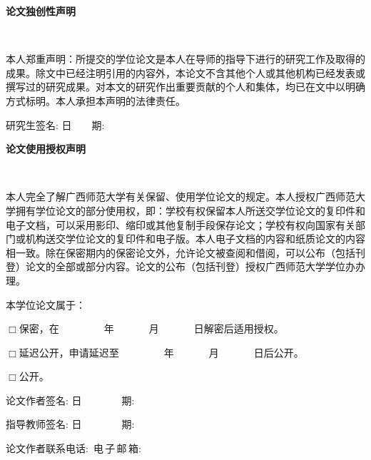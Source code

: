 ﻿\newpage
\thispagestyle{empty}
{\songti
\begin{center}
{\xiaoerhao\textbf{论文独创性声明}}
\end{center}
}
\begin{flushleft}
\setlength{\parindent}{2em}
\ \par
本人郑重声明：所提交的学位论文是本人在导师的指导下进行的研究工作及取得的成果。除文中已经注明引用的内容外，本论文不含其他个人或其他机构已经发表或撰写过的研究成果。对本文的研究作出重要贡献的个人和集体，均已在文中以明确方式标明。本人承担本声明的法律责任。\par
\end{flushleft}
\begin{flushright}
研究生签名: \underline{\hspace{2.5cm}}
日~~~~期: \underline{\hspace{2.5cm}}
\end{flushright}
\vspace{2cm}
{\songti
\begin{center}
{\xiaoerhao\textbf{论文使用授权声明}}
\end{center}
}
\begin{flushleft}
\setlength{\parindent}{2em}
\ \par
本人完全了解广西师范大学有关保留、使用学位论文的规定。本人授权广西师范大学拥有学位论文的部分使用权，即：学校有权保留本人所送交学位论文的复印件和电子文档，可以采用影印、缩印或其他复制手段保存论文；学校有权向国家有关部门或机构送交学位论文的复印件和电子版。本人电子文档的内容和纸质论文的内容相一致。除在保密期内的保密论文外，允许论文被查阅和借阅，可以公布（包括刊登）论文的全部或部分内容。论文的公布（包括刊登）授权广西师范大学学位办办理。\par
本学位论文属于：\par
$\Box$保密，在~~~~~~~~~年~~~~~~~月~~~~~~~日解密后适用授权。\par
$\Box$延迟公开，申请延迟至~~~~~~~~~年~~~~~~~月~~~~~~~日后公开。\par
$\Box$公开。\par
\end{flushleft}
\begin{flushright}
论文作者签名: \underline{\hspace{2.5cm}}
日~~~~~~~~期: \underline{\hspace{2.5cm}}\par
指导教师签名: \underline{\hspace{2.5cm}}
日~~~~~~~~期: \underline{\hspace{2.5cm}}\par
论文作者联系电话: \underline{\hspace{2.5cm}}
\,电\,子\,邮\,箱: \underline{\hspace{2.5cm}}\par
\end{flushright}
